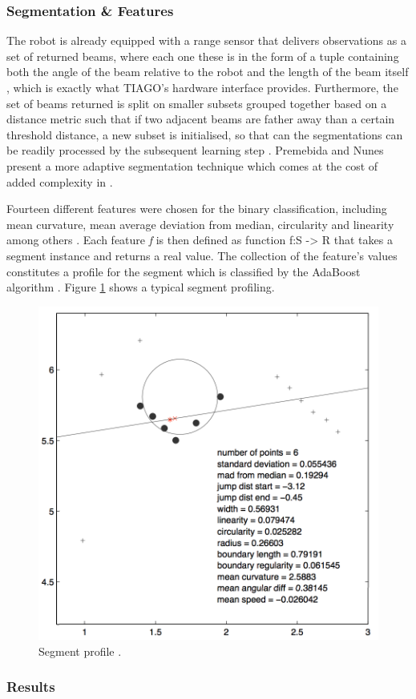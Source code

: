 \subsubsection{Segmentation \& Features}

The robot is already equipped with a range sensor that delivers observations as a set of returned beams, where each one these is in the form of a tuple containing both the angle of the beam relative to the robot and the length of the beam itself \cite{arras2007using}, which is exactly what TIAGO's hardware interface provides. Furthermore, the set of beams returned is split on smaller subsets grouped together based on a distance metric such that if two adjacent beams are father away than a certain threshold distance, a new subset is initialised, so that can the segmentations can be readily processed by the subsequent learning step \cite{arras2007using}. Premebida and Nunes present a more adaptive segmentation technique which comes at the cost of added complexity in \cite{premebida2005segmentation}.

Fourteen different features were chosen for the binary classification, including mean curvature, mean average deviation from median, circularity and linearity among others \cite{arras2007using}. Each feature \textit{f} is then defined as function f:S -> R that takes a segment instance and returns a real value. The collection of the feature's values constitutes a profile for the segment which is classified by the AdaBoost algorithm \cite{arras2007using}. Figure \ref{fig:features} shows a typical segment profiling.

\begin{figure}[!htbp]
\begin{center}
\includegraphics[width=.4\linewidth]{images/segment_profile.png}
\end{center}
\caption{Segment profile \cite{arras2007using}.}
\label{fig:features}
\end{figure}

\subsubsection{Results}

